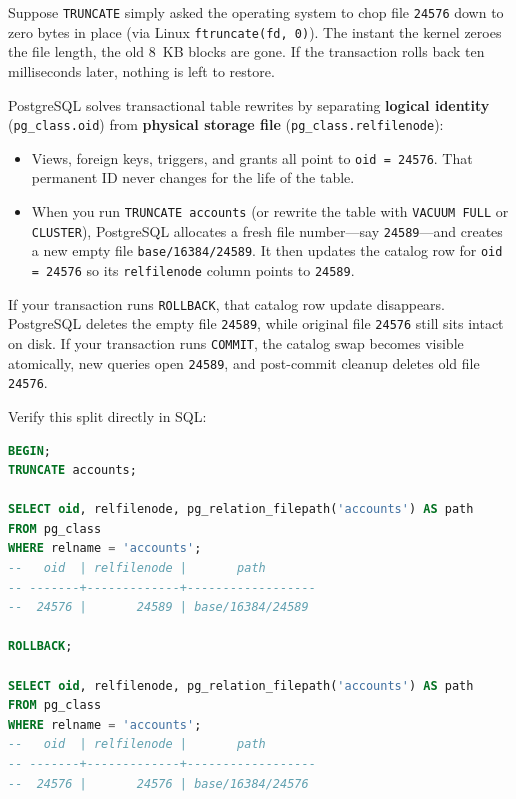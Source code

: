 Suppose \texttt{TRUNCATE} simply asked the operating system to chop file \texttt{24576} down to zero bytes in place (via Linux \texttt{ftruncate(fd, 0)}). The instant the kernel zeroes the file length, the old 8~KB blocks are gone. If the transaction rolls back ten milliseconds later, nothing is left to restore.

\begin{intuitionbox}
PostgreSQL solves transactional table rewrites by separating \textbf{logical identity} (\texttt{pg\_class.oid}) from \textbf{physical storage file} (\texttt{pg\_class.relfilenode}):
\begin{itemize}
  \item Views, foreign keys, triggers, and grants all point to \texttt{oid = 24576}. That permanent ID never changes for the life of the table.
  \item When you run \texttt{TRUNCATE accounts} (or rewrite the table with \texttt{VACUUM FULL} or \texttt{CLUSTER}), PostgreSQL allocates a fresh file number---say \texttt{24589}---and creates a new empty file \texttt{base/16384/24589}. It then updates the catalog row for \texttt{oid = 24576} so its \texttt{relfilenode} column points to \texttt{24589}.
\end{itemize}
If your transaction runs \texttt{ROLLBACK}, that catalog row update disappears. PostgreSQL deletes the empty file \texttt{24589}, while original file \texttt{24576} still sits intact on disk. If your transaction runs \texttt{COMMIT}, the catalog swap becomes visible atomically, new queries open \texttt{24589}, and post-commit cleanup deletes old file \texttt{24576}.
\end{intuitionbox}

Verify this split directly in SQL:

\begin{lstlisting}[language=SQL]
BEGIN;
TRUNCATE accounts;

SELECT oid, relfilenode, pg_relation_filepath('accounts') AS path
FROM pg_class
WHERE relname = 'accounts';
--   oid  | relfilenode |       path
-- -------+-------------+------------------
--  24576 |       24589 | base/16384/24589

ROLLBACK;

SELECT oid, relfilenode, pg_relation_filepath('accounts') AS path
FROM pg_class
WHERE relname = 'accounts';
--   oid  | relfilenode |       path
-- -------+-------------+------------------
--  24576 |       24576 | base/16384/24576
\end{lstlisting}


